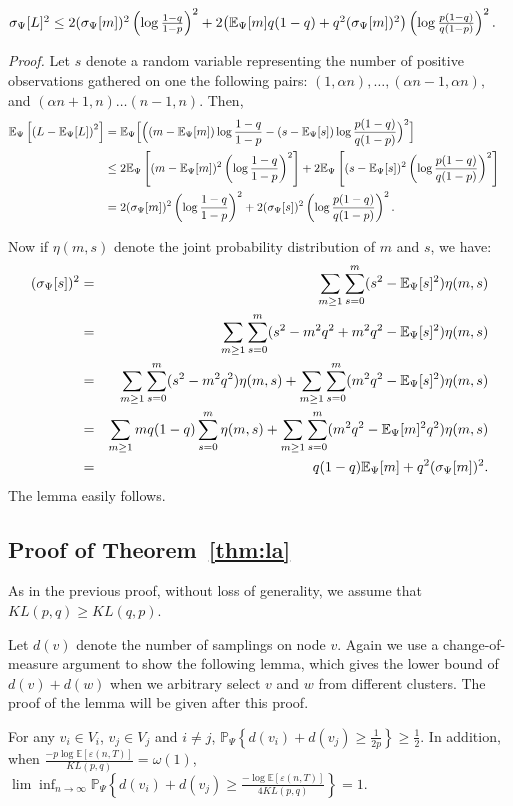 \begin{lemma} 
$\sigma_{\Psi} [L]^2 \le 2(\sigma_{\Psi} [m])^2 \left( \log\frac{1-q}{1-p}\right)^2+2\big( {\mathbb E}_{\Psi} [m] q(1-q) +q^2(\sigma_{\Psi} [m])^2 \big) \left( \log\frac{p(1-q)}{q(1-p)}\right)^2.$ 
 \label{lem:vark}
\end{lemma}

{\it Proof.} Let $s$ denote a random variable representing the number of positive observations gathered on one the following pairs: $(1,\alpha n), \dots,(\alpha n-1,\alpha n),$ and  $(\alpha n+1,n)\dots (n-1,n)$. Then,
\begin{align*}
{\mathbb E}_{\Psi} \left[ \left( L- {\mathbb E}_{\Psi} [L]\right)^2 \right]  & = {\mathbb E}_{\Psi} \Big[ \Big( (m - {\mathbb E}_{\Psi} [m]) \log\frac{1-q}{1-p} -(s-{\mathbb E}_{\Psi} [s]) \log \frac{p(1-q)}{q(1-p)} \Big)^2 \Big] \cr
& \le  2{\mathbb E}_{\Psi} \left[ (m - {\mathbb E}_{\Psi} [m])^2
  \left(\log\frac{1-q}{1-p}\right)^2 \right] +2{\mathbb E}_{\Psi} \left[(s-{\mathbb E}_{\Psi} [s])^2 \left(\log \frac{p(1-q)}{q(1-p)}\right)^2
\right] \cr
& =  2 (\sigma_{\Psi} [m])^2
  \left(\log\frac{1-q}{1-p}\right)^2 
+2(\sigma_{\Psi} [s])^2 \left(\log \frac{p(1-q)}{q(1-p)}\right)^2.
\end{align*}

Now if $\eta(m,s)$ denote the joint probability distribution of $m$ and
$s$, we have:
\begin{eqnarray*}
(\sigma_{\Psi} [s])^2  &=&  \sum_{m \ge 1}
\sum_{s=0}^{m}(s^2-{\mathbb E}_{\Psi} [s]^2) \eta(m,s) \cr 
&= & \sum_{m \ge 1} \sum_{s=0}^{m}(s^2-m^2 q^2 +m^2 q^2 - {\mathbb E}_{\Psi} [s]^2) \eta(m,s) \cr
&= & \sum_{m \ge 1} \sum_{s=0}^{m}(s^2-m^2 q^2) \eta(m,s) + \sum_{m \ge 1} \sum_{s=0}^{m}(m^2 q^2 - {\mathbb E}_{\Psi} [s]^2) \eta(m,s) \cr
& = & \sum_{m \ge 1} mq(1-q)\sum_{s=0}^{m} \eta(m,s) + \sum_{m \ge 1} \sum_{s=0}^{m}(m^2 q^2 - {\mathbb E}_{\Psi} [m]^2q^2) \eta(m,s) \cr 
&= & q(1-q) {\mathbb E}_{\Psi} [m]  +q^2 (\sigma_{\Psi}[m])^2. 
\end{eqnarray*}
The lemma easily follows.

\subsection{Proof of Theorem~\ref{thm:la}}
As in the previous proof, without loss of generality, we assume that $KL(p,q) \ge KL(q,p)$.

Let $d(v)$ denote the number of samplings on node $v$. Again we use a
change-of-measure argument to show the following lemma, which gives
the lower bound of $d(v)+d(w)$ when we arbitrary select $v$ and $w$
from different clusters. The proof of the lemma will be given after
this proof.
\begin{lemma} For any $v_i \in V_i$, $v_j \in V_j$ and $i\neq j$, $\mathbb{P}_{\Psi} \left\{d(v_i)+d(v_j) \ge  \frac{1}{2p}
\right\} \ge \frac{1}{2}$. In addition,
when $\frac{- p \log \mathbb{E}[\varepsilon (n,T)]}{KL(p,q) }  =
\omega( 1 )$, $\lim\inf_{n
\rightarrow \infty } \mathbb{P}_{\Psi} \left\{ 
d(v_i)+d(v_j) \ge \frac{-\log \mathbb{E}[\varepsilon (n,T)]}{4KL(p,q)}\right\}=1$.\label{lem:pdd}
\end{lemma}

